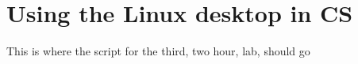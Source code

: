 \chapter{Using the Linux desktop in CS}

\begin{note}
  This is where the script for the third, two hour, lab, should go
\end{note}

